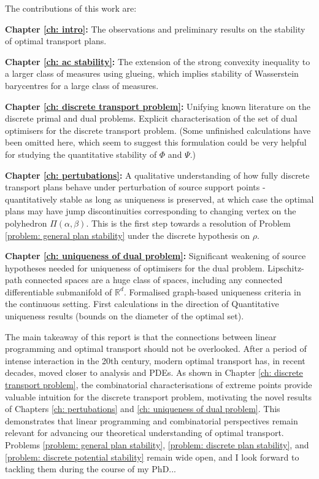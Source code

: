 \documentclass[11pt, oneside, titlepage]{book}
\theoremstyle{plain}
\theoremstyle{definition}
\newcommand{\R}{\mathbb{R}}
\newcounter{step}
\begin{document}
The contributions of this work are: 


\textbf{Chapter \ref{ch: intro}:} The observations and preliminary results on the stability of optimal transport plans.


\textbf{Chapter \ref{ch: ac stability}:} The extension of the strong convexity inequality to a larger class of measures using glueing, which implies stability of Wasserstein barycentres for a large class of measures.

\textbf{Chapter \ref{ch: discrete transport problem}:} Unifying known literature on the discrete primal and dual problems. Explicit characterisation of the set of dual optimisers for the discrete transport problem. (Some unfinished calculations have been omitted here, which seem to suggest this formulation could be very helpful for studying the quantitative stability of $\Phi$ and $\Psi$.)

\textbf{Chapter \ref{ch: pertubations}:} A qualitative understanding of how fully discrete transport plans behave under perturbation of source support points - quantitatively stable as long as uniqueness is preserved, at which case the optimal plans may have jump discontinuities corresponding to changing vertex on the polyhedron $\Pi(\alpha, \beta)$. This is the first step towards a resolution of Problem \ref{problem: general plan stability} under the discrete hypothesis on $\rho$.

\textbf{Chapter \ref{ch: uniqueness of dual problem}:} Significant weakening of source hypotheses needed for uniqueness of optimisers for the dual problem. Lipschitz-path connected spaces are a huge class of spaces, including any connected differentiable submanifold of $\R^d$. Formalised graph-based uniqueness criteria in the continuous setting. First calculations in the direction of Quantitative uniqueness results (bounds on the diameter of the optimal set).

The main takeaway of this report is that the connections between linear programming and optimal transport should not be overlooked. After a period of intense interaction in the 20th century, modern optimal transport has, in recent decades, moved closer to analysis and PDEs. As shown in Chapter \ref{ch: discrete transport problem}, the combinatorial characterisations of extreme points provide valuable intuition for the discrete transport problem, motivating the novel results of Chapters \ref{ch: pertubations} and \ref{ch: uniqueness of dual problem}. This demonstrates that linear programming and combinatorial perspectives remain relevant for advancing our theoretical understanding of optimal transport. Problems \ref{problem: general plan stability}, \ref{problem: discrete plan stability}, and \ref{problem: discrete potential stability} remain wide open, and I look forward to tackling them during the course of my PhD...
\end{document}
